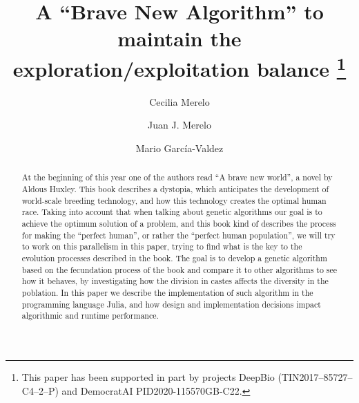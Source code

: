 \documentclass[runningheads]{llncs}
\begin{document}
%
\title{A ``Brave New Algorithm'' to maintain the exploration/exploitation
  balance \thanks{This paper has been supported in part by projects DeepBio (TIN2017--85727--C4--2--P) and DemocratAI PID2020-115570GB-C22.}}
%
%
\author{Cecilia Merelo \and
Juan J. Merelo \and Mario Garc\'ia-Valdez
 }
%
%
%
\maketitle              %
%
\begin{abstract}

At the beginning of this year one of the authors read ``A brave new
world'', a novel by Aldous Huxley.  This book describes a dystopia,
which anticipates the development of world-scale breeding technology,
and how this technology creates the optimal human race. Taking into
account that when talking about genetic algorithms our goal is to
achieve the optimum solution of a problem, and this book kind of
describes the process for making the “perfect human”, or rather the
``perfect human population'', we will try to work on this parallelism
in this paper, trying to find what is the key to the evolution
processes described in the book. The goal is to develop a genetic
algorithm based on the fecundation process of the book and compare it
to other algorithms to see how it behaves, by investigating how the
division in castes affects the diversity in the poblation. In this
paper we describe the implementation of such algorithm in the
programming language Julia, and how design and implementation
decisions impact algorithmic and runtime performance.

\end{abstract}










\end{document}
